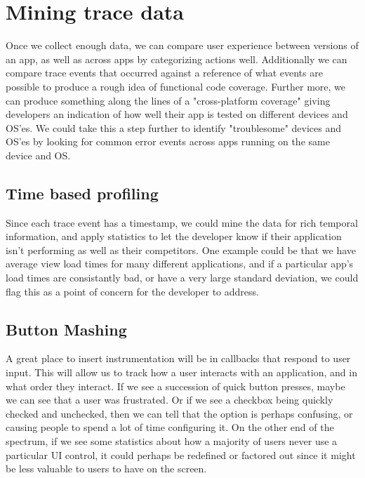 \section{Mining trace data}
\label{section:datamining}
Once we collect enough data, we can compare user experience between versions
of an app, as well as across apps by categorizing actions well. Additionally
we can compare trace events that occurred against a reference of what events
are possible to produce a rough idea of functional code coverage. Further
more, we can produce something along the lines of a "cross-platform coverage"
giving developers an indication of how well their app is tested on different
devices and OS'es. We could take this a step further to identify "troublesome"
devices and OS'es by looking for common error events across apps running on the
same device and OS.

\subsection{Time based profiling}
Since each trace event has a timestamp, we could mine the data for rich
temporal information, and apply statistics to let the developer know if their application
isn't performing as well as their competitors. One example could be that we have average 
view load times for many different applications, and if a particular app's load times
are consistantly bad, or have a very large standard deviation, we could flag this as a
point of concern for the developer to address.

\subsection{Button Mashing}
A great place to insert instrumentation will be in callbacks that respond to user input.
This will allow us to track how a user interacts with an application, and in what order
they interact. If we see a succession of quick button presses, maybe we can see that a user was 
frustrated. Or if we see a checkbox being quickly checked and unchecked, then we can tell that
the option is perhaps confusing, or causing people to spend a lot of time configuring it.
On the other end of the spectrum, if we see some statistics about how a majority of users
never use a particular UI control, it could perhaps be redefined or factored out since it might be
less valuable to users to have on the screen.
